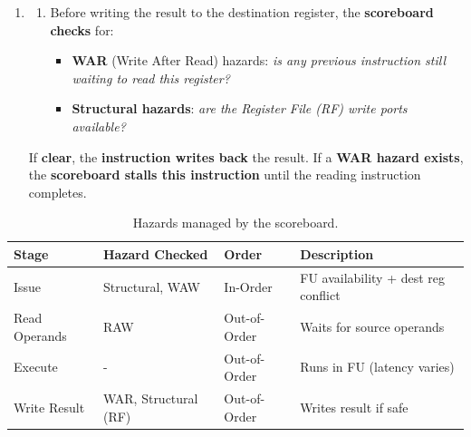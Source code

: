 \begin{enumerate}
    \item {}
    \begin{enumerate}
        \item Before writing the result to the destination register, the \textbf{scoreboard checks} for:
        \begin{itemize}
            \item \textbf{WAR} (Write After Read) hazards: \emph{is any previous instruction still waiting to read this register?}
            \item \textbf{Structural hazards}: \emph{are the Register File (RF) write ports available?}
        \end{itemize}
    \end{enumerate}
    If \textbf{clear}, the \textbf{instruction writes back} the result. If a \textbf{WAR hazard exists}, the \textbf{scoreboard stalls this instruction} until the reading instruction completes.
\end{enumerate}


\highspace
\begin{table}[!htp]
    \centering
    \begin{adjustbox}{width={\textwidth},totalheight={\textheight},keepaspectratio}
        \begin{tabular}{@{} l | l | l | l @{}}
            \toprule
            \textbf{Stage} & \textbf{Hazard Checked} & \textbf{Order} & \textbf{Description} \\
            \midrule
            Issue           & Structural, WAW       & In-Order      & FU availability + dest reg conflict \\ [.5em]
            Read Operands   & RAW                   & Out-of-Order  & Waits for source operands \\ [.5em]
            Execute         & -                     & Out-of-Order  & Runs in FU (latency varies) \\ [.5em]
            Write Result    & WAR, Structural (RF)  & Out-of-Order  & Writes result if safe \\
            \bottomrule
        \end{tabular}
    \end{adjustbox}
    \caption{Hazards managed by the scoreboard.}
\end{table}